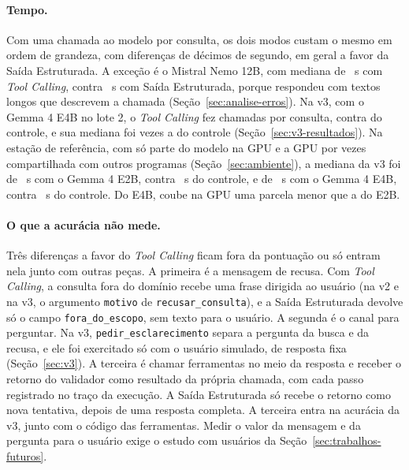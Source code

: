 \paragraph{Tempo.} Com uma chamada ao modelo por consulta, os dois modos custam o mesmo em ordem de grandeza, com diferenças de décimos de segundo, em geral a favor da Saída Estruturada. A exceção é o Mistral Nemo 12B, com mediana de ~s com \textit{Tool Calling}, contra ~s com Saída Estruturada, porque respondeu com textos longos que descrevem a chamada (Seção~\ref{sec:analise-erros}). Na v3, com o Gemma 4 E4B no lote 2, o \textit{Tool Calling} fez  chamadas por consulta, contra  do controle, e sua mediana foi  vezes a do controle (Seção~\ref{sec:v3-resultados}). Na estação de referência, com só parte do modelo na GPU e a GPU por vezes compartilhada com outros programas (Seção~\ref{sec:ambiente}), a mediana da v3 foi de ~s com o Gemma 4 E2B, contra ~s do controle, e de ~s com o Gemma 4 E4B, contra ~s do controle. Do E4B, coube na GPU uma parcela menor que a do E2B.

\paragraph{O que a acurácia não mede.} Três diferenças a favor do \textit{Tool Calling} ficam fora da pontuação ou só entram nela junto com outras peças. A primeira é a mensagem de recusa. Com \textit{Tool Calling}, a consulta fora do domínio recebe uma frase dirigida ao usuário (na v2 e na v3, o argumento \texttt{motivo} de \texttt{recusar\_consulta}), e a Saída Estruturada devolve só o campo \texttt{fora\_do\_escopo}, sem texto para o usuário. A segunda é o canal para perguntar. Na v3, \texttt{pedir\_esclarecimento} separa a pergunta da busca e da recusa, e ele foi exercitado só com o usuário simulado, de resposta fixa (Seção~\ref{sec:v3}). A terceira é chamar ferramentas no meio da resposta e receber o retorno do validador como resultado da própria chamada, com cada passo registrado no traço da execução. A Saída Estruturada só recebe o retorno como nova tentativa, depois de uma resposta completa. A terceira entra na acurácia da v3, junto com o código das ferramentas. Medir o valor da mensagem e da pergunta para o usuário exige o estudo com usuários da Seção~\ref{sec:trabalhos-futuros}.

